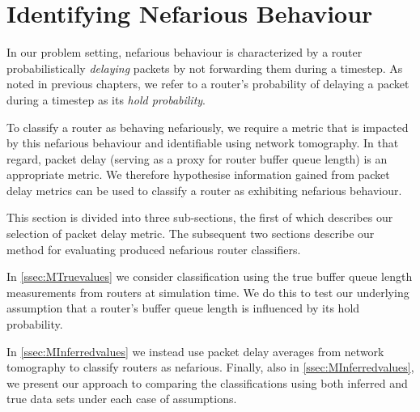 \section{Identifying Nefarious Behaviour}
\label{sec:MNefidentification}
In our problem setting, nefarious behaviour is characterized by a router probabilistically \textit{delaying} packets by not forwarding them during a timestep. As noted in previous chapters, we refer to a router's probability of delaying a packet during a timestep as its \textit{hold probability}.\par
To classify a router as behaving nefariously, we require a metric that is impacted by this nefarious behaviour and identifiable using network tomography. In that regard, packet delay (serving as a proxy for router buffer queue length) is an appropriate metric. We therefore hypothesise information gained from packet delay metrics can be used to classify a router as exhibiting nefarious behaviour.\par
This section is divided into three sub-sections, the first of which describes our selection of packet delay metric. The subsequent two sections describe our method for evaluating produced nefarious router classifiers.\par
In \cref{ssec:MTruevalues} we consider classification using the true buffer queue length measurements from routers at simulation time. We do this to test our underlying assumption that a router's buffer queue length is influenced by its hold probability.\par
In \cref{ssec:MInferredvalues} we instead use packet delay averages from network tomography to classify routers as nefarious. Finally, also in \cref{ssec:MInferredvalues}, we present our approach to comparing the classifications using both inferred and true data sets under each case of assumptions.
  
